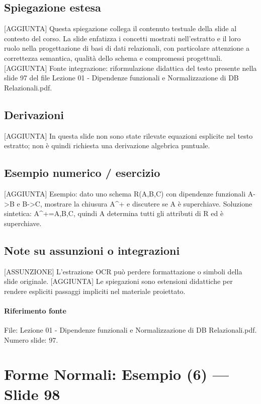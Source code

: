 \documentclass[11pt]{article}
\begin{document}
\subsection*{Spiegazione estesa}
[AGGIUNTA] Questa spiegazione collega il contenuto testuale della slide al contesto del corso. La slide enfatizza i concetti mostrati nell'estratto e il loro ruolo nella progettazione di basi di dati relazionali, con particolare attenzione a correttezza semantica, qualità dello schema e compromessi progettuali.
[AGGIUNTA] Fonte integrazione: riformulazione didattica del testo presente nella slide 97 del file Lezione 01 - Dipendenze funzionali e Normalizzazione di DB Relazionali.pdf.
\subsection*{Derivazioni}
[AGGIUNTA] In questa slide non sono state rilevate equazioni esplicite nel testo estratto; non è quindi richiesta una derivazione algebrica puntuale.
\subsection*{Esempio numerico / esercizio}
[AGGIUNTA] Esempio: dato uno schema R(A,B,C) con dipendenze funzionali A->B e B->C, mostrare la chiusura A^+ e discutere se A è superchiave. Soluzione sintetica: A^+={A,B,C}, quindi A determina tutti gli attributi di R ed è superchiave.
\subsection*{Note su assunzioni o integrazioni}
[ASSUNZIONE] L'estrazione OCR può perdere formattazione o simboli della slide originale.
[AGGIUNTA] Le spiegazioni sono estensioni didattiche per rendere espliciti passaggi impliciti nel materiale proiettato.
\paragraph{Riferimento fonte} File: Lezione 01 - Dipendenze funzionali e Normalizzazione di DB Relazionali.pdf. Numero slide: 97.
\section{Forme Normali: Esempio (6) --- Slide 98}
\end{document}
